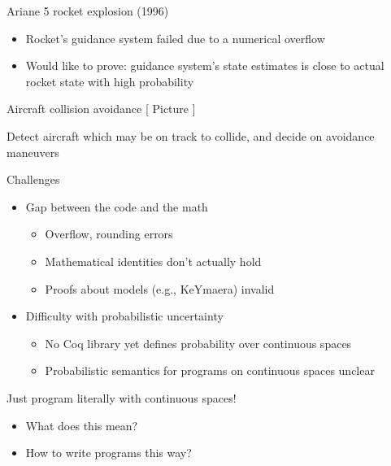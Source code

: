 \documentclass[14pt, notes]{beamer}
\begin{document}
\begin{frame}{Ariane 5 rocket explosion (1996)}

\begin{itemize}
\item Rocket's guidance system failed due to a numerical overflow
\item Would like to prove: guidance system's state estimates is close to actual rocket state with high probability
\end{itemize}
\end{frame}

\begin{frame}{Aircraft collision avoidance}
[ Picture ]

Detect aircraft which may be on track to collide, and decide on avoidance maneuvers
\end{frame}

\begin{frame}{Challenges}
\begin{itemize}
\item Gap between the code and the math
  \begin{itemize}
  \item Overflow, rounding errors
  \item Mathematical identities don't actually hold
  \item Proofs about models (e.g., KeYmaera) invalid
  \end{itemize}
\item Difficulty with probabilistic uncertainty
  \begin{itemize}
  \item No Coq library yet defines probability over continuous spaces
  \item Probabilistic semantics for programs on continuous spaces unclear
  \end{itemize}
\end{itemize}
\end{frame}

\begin{frame}
\begin{center}
\huge Just program literally with continuous spaces!
\end{center}

\bigskip
\pause

\begin{itemize}
\item What does this mean?
\item How to write programs this way?
\end{itemize}
\end{frame}
\end{document}
